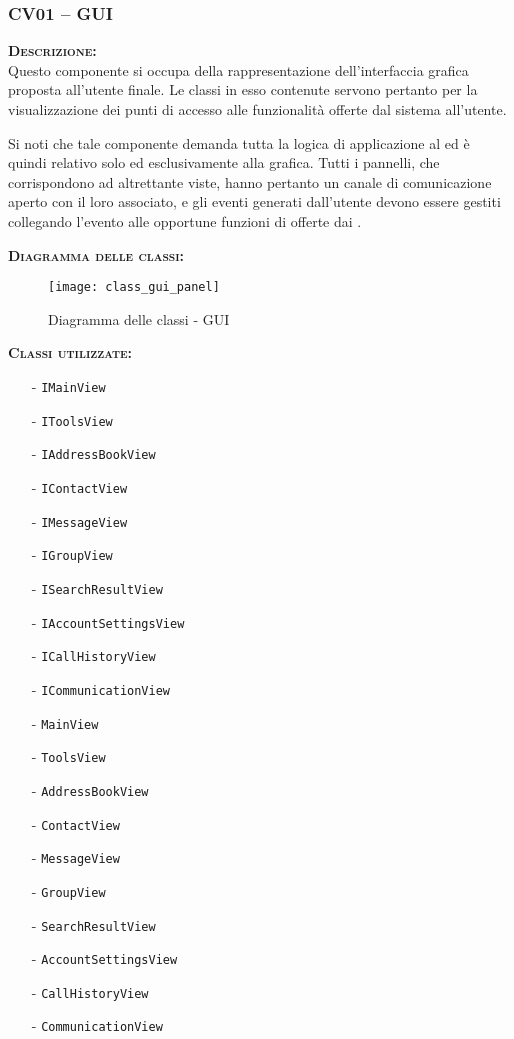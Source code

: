 \subsubsection{CV01 -- GUI}\label{sec:cv01}
\begin{description}
	\item{\scshape\bfseries Descrizione:}\\
Questo componente si occupa della rappresentazione dell'interfaccia grafica proposta all'utente finale. Le classi in esso contenute servono pertanto per la visualizzazione dei punti di accesso alle funzionalità offerte dal sistema all'utente.

Si noti che tale componente demanda tutta la logica di applicazione al  ed è quindi relativo solo ed esclusivamente alla grafica. Tutti i pannelli, che corrispondono ad altrettante viste, hanno pertanto un canale di comunicazione aperto con il  loro associato, e gli eventi generati dall'utente devono essere gestiti collegando l'evento alle opportune funzioni di  offerte dai .

	\item{\scshape\bfseries Diagramma delle classi:}
  \begin{figure}[H]
    \centering
    
   \texttt{[image: class\_gui\_panel]}
    \caption{Diagramma delle classi - GUI}\label{fig:gui}
  \end{figure}

	\item{\scshape\bfseries Classi utilizzate:} 
	\begin{itemize}[noitemsep,nolistsep]
		\item[-] \texttt{IMainView}
		\item[-] \texttt{IToolsView}
		\item[-] \texttt{IAddressBookView}
		\item[-] \texttt{IContactView}
		\item[-] \texttt{IMessageView}
		\item[-] \texttt{IGroupView}
		\item[-] \texttt{ISearchResultView}
		\item[-] \texttt{IAccountSettingsView}
		\item[-] \texttt{ICallHistoryView}
		\item[-] \texttt{ICommunicationView}
		\item[-] \texttt{MainView}
		\item[-] \texttt{ToolsView}
		\item[-] \texttt{AddressBookView}
		\item[-] \texttt{ContactView}
		\item[-] \texttt{MessageView}
		\item[-] \texttt{GroupView}
		\item[-] \texttt{SearchResultView}
		\item[-] \texttt{AccountSettingsView}
		\item[-] \texttt{CallHistoryView}
		\item[-] \texttt{CommunicationView}
	\end{itemize}  
\end{description}

